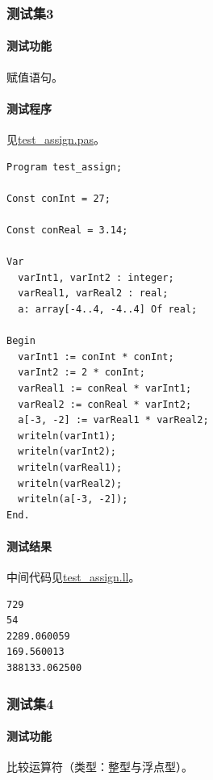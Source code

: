 \documentclass[lang=cn,11pt,a4paper,cite=authornum]{paper}
\begin{document}
\subsubsection{测试集3}

\paragraph{测试功能} 赋值语句。

\paragraph{测试程序} 见\href{run:../test/test_assign.pas}{test\_assign.pas}。

\begin{code}
\begin{verbatim}
Program test_assign;

Const conInt = 27;

Const conReal = 3.14;

Var 
  varInt1, varInt2 : integer;
  varReal1, varReal2 : real;
  a: array[-4..4, -4..4] Of real;

Begin
  varInt1 := conInt * conInt;
  varInt2 := 2 * conInt;
  varReal1 := conReal * varInt1;
  varReal2 := conReal * varInt2;
  a[-3, -2] := varReal1 * varReal2;
  writeln(varInt1);
  writeln(varInt2);
  writeln(varReal1);
  writeln(varReal2);
  writeln(a[-3, -2]);
End.
\end{verbatim}
\end{code}

\paragraph{测试结果} 中间代码见\href{run:../test/test_assign.ll}{test\_assign.ll}。

\begin{code}
\begin{verbatim}
729
54
2289.060059
169.560013
388133.062500
\end{verbatim}
\end{code}

\subsubsection{测试集4}

\paragraph{测试功能} 比较运算符（类型：整型与浮点型）。
\end{document}
